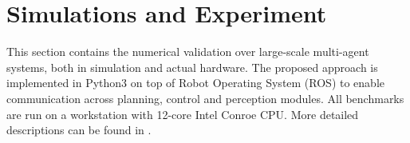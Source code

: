 \section{Simulations and Experiment}\label{sec:experiments}

This section contains the numerical validation over large-scale multi-agent systems, both in simulation and actual hardware.
The proposed approach is implemented in Python3 on top of Robot Operating System (ROS) to enable communication across planning, control and perception modules.
All benchmarks are run on a workstation with 12-core Intel Conroe CPU.
More detailed descriptions can be found in  \citep{liu2022arxiv}.




